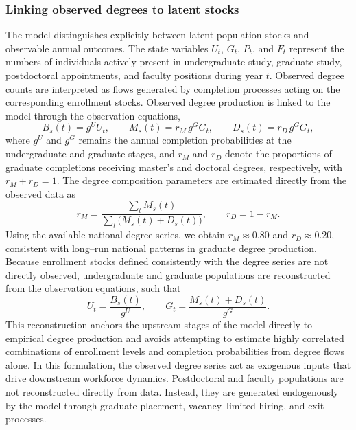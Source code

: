 \documentclass[3p]{elsarticle}%
\theoremstyle{definition}
\begin{document}
\subsubsection{Linking observed degrees to latent stocks}
 \noindent The model distinguishes explicitly between latent population stocks and observable annual outcomes. The state variables $U_t$, $G_t$, $P_t$, and $F_t$ represent the numbers of individuals actively present in undergraduate study, graduate study, postdoctoral appointments, and faculty positions during year $t$. Observed degree counts are interpreted as flows generated by completion processes acting on the corresponding enrollment stocks. Observed degree production is linked to the model through the observation equations,
\begin{equation}
B_s(t) = g^U U_t,
\qquad
M_s(t) = r_{M}\, g^G G_t,
\qquad
D_s(t) = r_D\, g^G G_t,
\label{eq:obslink}
\end{equation}
where $g^U$ and $g^G$ remains the annual completion probabilities at the undergraduate and graduate stages, and $r_{M}$ and $r_D$ denote the proportions of graduate completions receiving master’s and doctoral degrees, respectively, with $r_{M}+r_D=1$. The degree composition parameters are estimated directly from the observed data as
\begin{equation}
r_{M} = \frac{\sum_t M_s(t)}{\sum_t \bigl(M_s(t)+D_s(t)\bigr)},
\qquad
r_D = 1-r_{M}.
\label{eq:rM}
\end{equation}
\noindent Using the available national degree series, we obtain $r_{M}\approx0.80$ and $r_D\approx0.20$, consistent with long--run national patterns in graduate degree production. Because enrollment stocks defined consistently with the degree series are not directly observed, undergraduate and graduate populations are reconstructed from the observation equations, such that
\begin{equation}
U_t = \frac{B_s(t)}{g^U},
\qquad
G_t = \frac{M_s(t)+D_s(t)}{g^G}.
\label{eq:reconstructUG}
\end{equation}
\noindent This reconstruction anchors the upstream stages of the model directly to empirical degree production and avoids attempting to estimate highly correlated combinations of enrollment levels and completion probabilities from degree flows alone. In this formulation, the observed degree series act as exogenous inputs that drive downstream workforce dynamics. Postdoctoral and faculty populations are not reconstructed directly from data. Instead, they are generated endogenously by the model through graduate placement, vacancy--limited hiring, and exit processes. 
\end{document}
